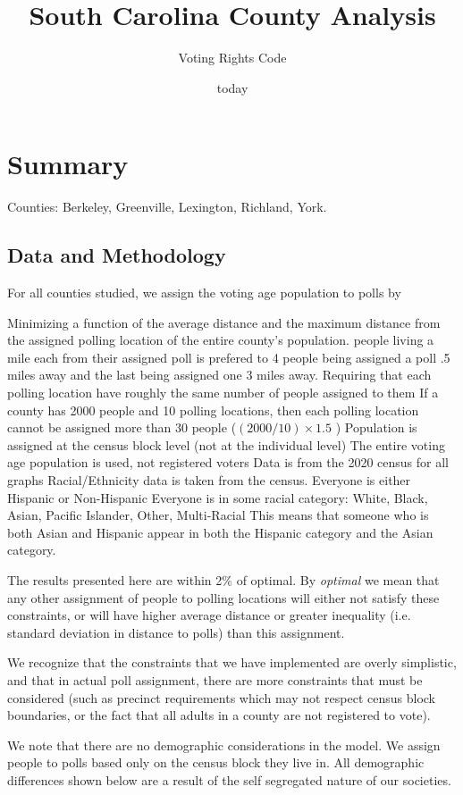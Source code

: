 \documentclass[11pt]{article}
\title{South Carolina County Analysis}
\author{Voting Rights Code}
\date{today}
\theoremstyle{remark}
\theoremstyle{definition}
\begin{document}
\section{Summary}
	
	Counties: Berkeley, Greenville, Lexington, Richland, York.
\subsection{Data and Methodology}
	For all counties studied, we assign the voting age population to polls by 
\begin{outline}
	\1 Minimizing a function of the average distance and the maximum distance from the assigned polling location of the entire county's population.
		 people living a mile each from their assigned poll is prefered to 4 people being assigned a poll .5 miles away and the last being assigned one 3 miles away.
	\1 Requiring that each polling location have roughly the same number of people assigned to them
		\2 If a county has 2000 people and 10 polling locations, then each polling location cannot be assigned more than 30 people ($(2000 / 10) \times 1.5$ )
	\1 Population is assigned at the census block level (not at the individual level)
		\2 The entire voting age population is used, not registered voters
		\2 Data is from the 2020 census for all graphs
		\2 Racial/Ethnicity data is taken from the census.
			\3 Everyone is either Hispanic or Non-Hispanic
			\3 Everyone is in some racial category: White, Black, Asian, Pacific Islander, Other, Multi-Racial
			\3 This means that someone who is both Asian and Hispanic appear in both the Hispanic category and the Asian category.
\end{outline}

The results presented here are within 2$\%$ of optimal. By \emph{optimal} we mean that any other assignment of people to polling locations will either not satisfy these constraints, or will have higher average distance or greater inequality (i.e. standard deviation in distance to polls) than this assignment. 

We recognize that the constraints that we have implemented are overly simplistic, and that in actual poll assignment, there are more constraints that must be considered (such as precinct requirements which may not respect census block boundaries, or the fact that all adults in a county are not registered to vote).

We note that there are no demographic considerations in the model. We assign people to polls based only on the census block they live in. All demographic differences shown below are a result of the self segregated nature of our societies.
\end{document}
